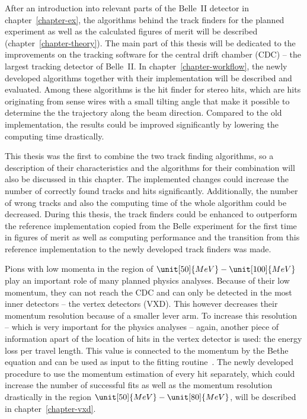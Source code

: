 After an introduction into relevant parts of the Belle~II detector in chapter~\ref{chapter-ex}, the algorithms behind the track finders for the planned experiment as well as the calculated figures of merit will be described (chapter~\ref{chapter-theory}). The main part of this thesis will be dedicated to the improvements on the tracking software for the central drift chamber (CDC) -- the largest tracking detector of Belle~II. In chapter~\ref{chapter-workflow}, the newly developed algorithms together with their implementation will be described and evaluated. Among these algorithms is the hit finder for stereo hits, which are hits originating from sense wires with a small tilting angle that make it possible to determine the the trajectory along the beam direction. Compared to the old implementation, the results could be improved significantly by lowering the computing time drastically.

This thesis was the first to combine the two track finding algorithms, so a description of their characteristics and the algorithms for their combination will also be discussed in this chapter. The implemented changes could increase the number of correctly found tracks and hits significantly. Additionally, the number of wrong tracks and also the computing time of the whole algorithm could be decreased. During this thesis, the track finders could be enhanced to outperform the reference implementation copied from the Belle experiment for the first time in figures of merit as well as computing performance and the transition from this reference implementation to the newly developed track finders was made.

Pions with low momenta in the region of $\unit[50]{MeV} - \unit[100]{MeV}$ play an important role of many planned physics analyses. Because of their low momentum, they can not reach the CDC and can only be detected in the most inner detectors -- the vertex detectors (VXD). This however decreases their momentum resolution because of a smaller lever arm. To increase this resolution -- which is very important for the physics analyses -- again, another piece of information apart of the location of hits in the vertex detector is used: the energy loss per travel length. This value is connected to the momentum by the Bethe equation and can be used as input to the fitting routine~\cite{robert}. The newly developed procedure to use the momentum estimation of every hit separately, which could increase the number of successful fits as well as the momentum resolution drastically in the region $\unit[50]{MeV} - \unit[80]{MeV}$, will be described in chapter~\ref{chapter-vxd}.

